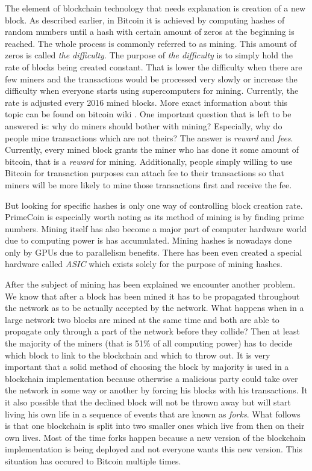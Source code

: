 \documentclass[a4paper,12pt,twoside,openany]{report}
\begin{document}
The element of blockchain technology that needs explanation is creation of a new block. As described earlier, in Bitcoin it is achieved by computing hashes of random numbers until a hash with certain amount of zeros at the beginning is reached. The whole process is commonly referred to as mining. This amount of zeros is called \textit{the difficulty}. The purpose of \textit{the difficulty} is to simply hold the rate of blocks being created constant. That is lower the difficulty when there are few miners and the transactions would be processed very slowly or increase the difficulty when everyone starts using supercomputers for mining. Currently, the rate is adjusted every 2016 mined blocks. More exact information about this topic can be found on bitcoin wiki \cite{Bitcoinwiki}. One important question that is left to be answered is: why do miners should bother with mining? Especially, why do people mine transactions which are not theirs? The answer is \textit{reward} and \textit{fees}. Currently, every mined block grants the miner who has done it some amount of bitcoin, that is a \textit{reward} for mining. Additionally, people simply willing to use Bitcoin for transaction purposes can attach fee to their transactions so that miners will be more likely to mine those transactions first and receive the fee. 

But looking for specific hashes is only one way of controlling block creation rate. PrimeCoin is especially worth noting as its method of mining is by finding prime numbers. Mining itself has also become a major part of computer hardware world due to computing power is has accumulated. Mining hashes is nowadays done only by GPUs due to parallelism benefits. There has been even created a special hardware called \textit{ASIC} which exists solely for the purpose of mining hashes.

After the subject of mining has been explained we encounter another problem. We know that after a block has been mined it has to be propagated throughout the network as to be actually accepted by the network.
What happens when in a large network two blocks are mined at the same time and both are able to propagate only through a part of the network before they collide? Then at least the majority of the miners (that is 51\% of all computing power) has to decide which block to link to the blockchain and which to throw out. It is very important that a solid method of choosing the block by majority is used in a blockchain implementation because otherwise a malicious party could take over the network in some way or another by forcing his blocks with his transactions. It it also possible that the declined block will not be thrown away but will start living his own life in a sequence of events that are known as \textit{forks}. What follows is that one blockchain is split into two smaller ones which live from then on their own lives. Most of the time forks happen because a new version of the blockchain implementation is being deployed and not everyone wants this new version. This situation has occured to Bitcoin multiple times.
\end{document}
